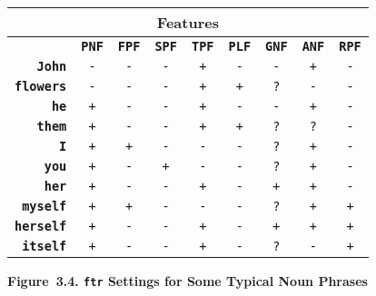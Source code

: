 \documentclass{article}
\begin{document}
\bigbreak
\begin{minipage}{\textwidth}
  \centering
  \begin{tabular}{|r|c|c|c|c|c|c|c|c|}
    \hline
    \multicolumn{9}{|c|}{\textbf{Features}} \\
    \hline
    & \textbf{\texttt{PNF}}
    & \textbf{\texttt{FPF}} & \textbf{\texttt{SPF}}
    & \textbf{\texttt{TPF}} & \textbf{\texttt{PLF}}
    & \textbf{\texttt{GNF}} & \textbf{\texttt{ANF}}
    & \textbf{\texttt{RPF}} \\
    \textbf{\texttt{John}} & \texttt{-}
    & \texttt{-} & \texttt{-}
    & \texttt{+} & \texttt{-}
    & \texttt{-} & \texttt{+}
    & \texttt{-} \\
    \textbf{\texttt{flowers}} & \texttt{-}
    & \texttt{-} & \texttt{-}
    & \texttt{+} & \texttt{+}
    & \texttt{?} & \texttt{-}
    & \texttt{-} \\
    \textbf{\texttt{he}} & \texttt{+}
    & \texttt{-} & \texttt{-}
    & \texttt{+} & \texttt{-}
    & \texttt{-} & \texttt{+}
    & \texttt{-} \\
    \textbf{\texttt{them}} & \texttt{+}
    & \texttt{-} & \texttt{-}
    & \texttt{+} & \texttt{+}
    & \texttt{?} & \texttt{?}
    & \texttt{-} \\
    \textbf{\texttt{I}} & \texttt{+}
    & \texttt{+} & \texttt{-}
    & \texttt{-} & \texttt{-}
    & \texttt{?} & \texttt{+}
    & \texttt{-} \\
    \textbf{\texttt{you}} & \texttt{+}
    & \texttt{-} & \texttt{+}
    & \texttt{-} & \texttt{-}
    & \texttt{?} & \texttt{+}
    & \texttt{-} \\
    \textbf{\texttt{her}} & \texttt{+}
    & \texttt{-} & \texttt{-}
    & \texttt{+} & \texttt{-}
    & \texttt{+} & \texttt{+}
    & \texttt{-} \\
    \textbf{\texttt{myself}} & \texttt{+}
    & \texttt{+} & \texttt{-}
    & \texttt{-} & \texttt{-}
    & \texttt{?} & \texttt{+}
    & \texttt{+} \\
    \textbf{\texttt{herself}} & \texttt{+}
    & \texttt{-} & \texttt{-}
    & \texttt{+} & \texttt{-}
    & \texttt{+} & \texttt{+}
    & \texttt{+} \\
    \textbf{\texttt{itself}} & \texttt{+}
    & \texttt{-} & \texttt{-}
    & \texttt{+} & \texttt{-}
    & \texttt{?} & \texttt{-}
    & \texttt{+} \\
    \hline
  \end{tabular}
\end{minipage}
\bigbreak
\textbf{Figure~3.4. \texttt{ftr} Settings for Some Typical Noun Phrases}
\bigbreak
\end{document}
